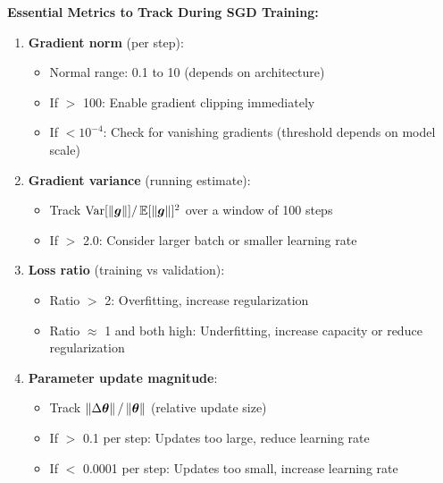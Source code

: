 \documentclass[../../main.tex]{subfiles}
\begin{document}
\begin{important}
\textbf{Essential Metrics to Track During SGD Training:}

\begin{enumerate}
    \item \textbf{Gradient norm} (per step):
    \begin{itemize}
        \item Normal range: 0.1 to 10 (depends on architecture)
        \item If $>$ 100: Enable gradient clipping immediately
        \item If $< 10^{-4}$: Check for vanishing gradients (threshold depends on model scale)
    \end{itemize}

    \item \textbf{Gradient variance} (running estimate):
    \begin{itemize}
        \item Track $\operatorname{Var}[\left\lVert \boldsymbol{g} \right\rVert] / \operatorname{\mathbb{E}}[\left\lVert \boldsymbol{g} \right\rVert]^2$ over a window of 100 steps
        \item If $>$ 2.0: Consider larger batch or smaller learning rate
    \end{itemize}

    \item \textbf{Loss ratio} (training vs validation):
    \begin{itemize}
        \item Ratio $>$ 2: Overfitting, increase regularization
        \item Ratio $\approx$ 1 and both high: Underfitting, increase capacity or reduce regularization
    \end{itemize}

    \item \textbf{Parameter update magnitude}:
    \begin{itemize}
        \item Track $\left\lVert \Delta \boldsymbol{\theta} \right\rVert / \left\lVert \boldsymbol{\theta} \right\rVert$ (relative update size)
        \item If $>$ 0.1 per step: Updates too large, reduce learning rate
        \item If $<$ 0.0001 per step: Updates too small, increase learning rate
    \end{itemize}
\end{enumerate}
\end{important}
\end{document}
